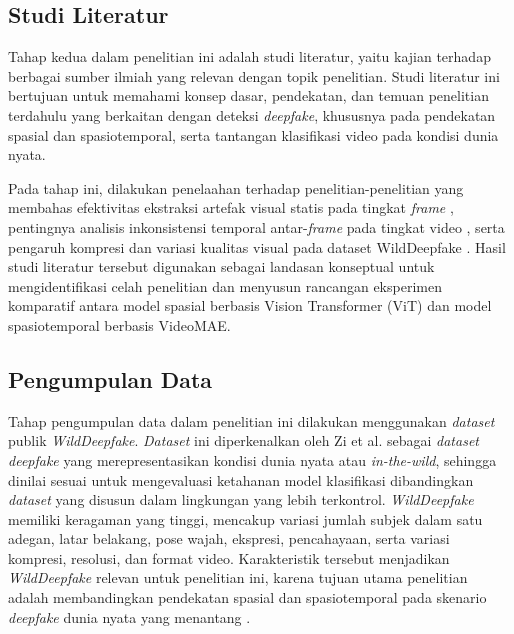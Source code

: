 \subsection{Studi Literatur} \label{III.Studi Literatur}
Tahap kedua dalam penelitian ini adalah studi literatur, yaitu kajian terhadap berbagai sumber ilmiah yang relevan dengan topik penelitian. Studi literatur ini bertujuan untuk memahami konsep dasar, pendekatan, dan temuan penelitian terdahulu yang berkaitan dengan deteksi \textit{deepfake}, khususnya pada pendekatan spasial dan spasiotemporal, serta tantangan klasifikasi video pada kondisi dunia nyata. \par

Pada tahap ini, dilakukan penelaahan terhadap penelitian-penelitian yang membahas efektivitas ekstraksi artefak visual statis pada tingkat \textit{frame} \cite{Tolosana2020}\cite{Cao2022}, pentingnya analisis inkonsistensi temporal antar-\textit{frame} pada tingkat video \cite{Gu2021}, serta pengaruh kompresi dan variasi kualitas visual pada dataset WildDeepfake \cite{Zi2024}. Hasil studi literatur tersebut digunakan sebagai landasan konseptual untuk mengidentifikasi celah penelitian dan menyusun rancangan eksperimen komparatif antara model spasial berbasis Vision Transformer (ViT) dan model spasiotemporal berbasis VideoMAE. \par

\subsection{Pengumpulan Data} \label{III.Pengumpulan Data}
Tahap pengumpulan data dalam penelitian ini dilakukan menggunakan \textit{dataset} publik \textit{WildDeepfake}\cite{wilddeepfake_hf}. \textit{Dataset} ini diperkenalkan oleh Zi et al. \cite{Zi2024} sebagai \textit{dataset deepfake} yang merepresentasikan kondisi dunia nyata atau \textit{in-the-wild}, sehingga dinilai sesuai untuk mengevaluasi ketahanan model klasifikasi dibandingkan \textit{dataset} yang disusun dalam lingkungan yang lebih terkontrol. \textit{WildDeepfake} memiliki keragaman yang tinggi, mencakup variasi jumlah subjek dalam satu adegan, latar belakang, pose wajah, ekspresi, pencahayaan, serta variasi kompresi, resolusi, dan format video. Karakteristik tersebut menjadikan \textit{WildDeepfake} relevan untuk penelitian ini, karena tujuan utama penelitian adalah membandingkan pendekatan spasial dan spasiotemporal pada skenario \textit{deepfake} dunia nyata yang menantang \cite{Zi2024}. \par

